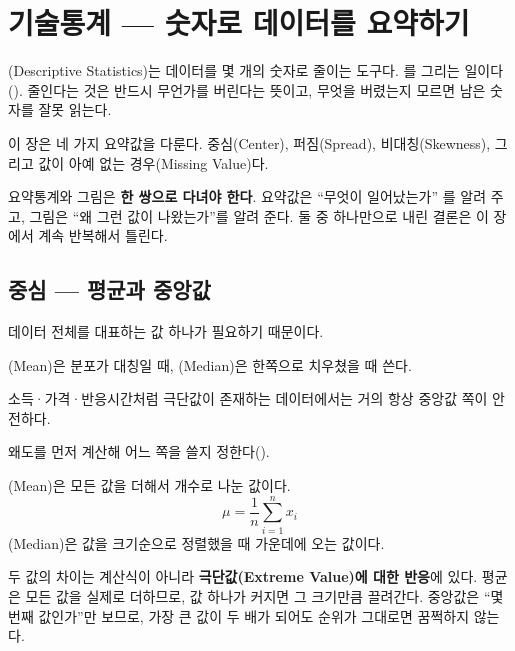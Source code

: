 \chapter{기술통계 --- 숫자로 데이터를 요약하기}
\label{ch:descriptive}

(Descriptive Statistics)는 데이터를 몇 개의 숫자로 줄이는
도구다. 를 그리는 일이다(). 줄인다는 것은
반드시 무언가를 버린다는 뜻이고, 무엇을 버렸는지 모르면 남은 숫자를 잘못 읽는다.

이 장은 네 가지 요약값을 다룬다. 중심(Center), 퍼짐(Spread), 비대칭(Skewness),
그리고 값이 아예 없는 경우(Missing Value)다.

\begin{keyidea}
요약통계와 그림은 \textbf{한 쌍으로 다녀야 한다}. 요약값은 ``무엇이 일어났는가''
를 알려 주고, 그림은 ``왜 그런 값이 나왔는가''를 알려 준다. 둘 중 하나만으로
내린 결론은 이 장에서 계속 반복해서 틀린다.
\end{keyidea}

\section{중심 --- 평균과 중앙값}
\label{sec:center}

\begin{inbrief}
  \item[Why] 데이터 전체를 대표하는 값 하나가 필요하기 때문이다.
  \item[When] (Mean)은 분포가 대칭일 때, (Median)은
              한쪽으로 치우쳤을 때 쓴다.
  \item[Where] 소득·가격·반응시간처럼 극단값이 존재하는 데이터에서는 거의 항상
               중앙값 쪽이 안전하다.
  \item[How] 왜도를 먼저 계산해 어느 쪽을 쓸지 정한다().
\end{inbrief}

\begin{definition}[중심의 두 정의]
\label{def:center}
(Mean)은 모든 값을 더해서 개수로 나눈 값이다.
\[
  \mu = \frac{1}{n}\sum_{i=1}^{n} x_i
\]
(Median)은 값을 크기순으로 정렬했을 때 가운데에 오는 값이다.
\end{definition}

두 값의 차이는 계산식이 아니라 \textbf{극단값(Extreme Value)에 대한 반응}에
있다. 평균은 모든 값을 실제로 더하므로, 값 하나가 커지면 그 크기만큼 끌려간다.
중앙값은 ``몇 번째 값인가''만 보므로, 가장 큰 값이 두 배가 되어도 순위가 그대로면
꿈쩍하지 않는다.

